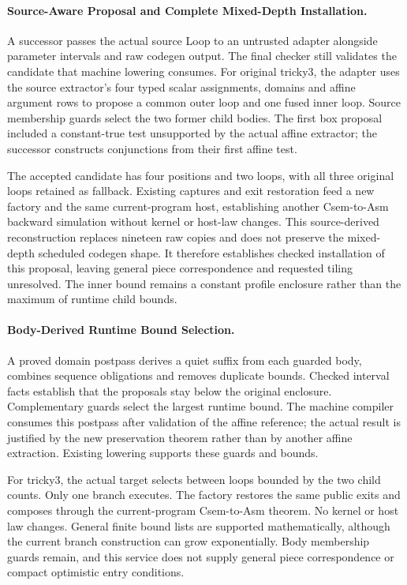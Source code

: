 \paragraph{Source-Aware Proposal and Complete Mixed-Depth Installation.}
A successor passes the actual source Loop to an untrusted adapter alongside
parameter intervals and raw codegen output. The final checker still validates
the candidate that machine lowering consumes. For original tricky3, the adapter
uses the source extractor's four typed scalar assignments, domains and affine
argument rows to propose a common outer loop and one fused inner loop. Source
membership guards select the two former child bodies. The first box proposal
included a constant-true test unsupported by the actual affine extractor;
the successor constructs conjunctions from their first affine test.

The accepted candidate has four positions and two loops, with all three
original loops retained as fallback. Existing captures and exit restoration
feed a new factory and the same current-program host, establishing another
Csem-to-Asm backward simulation without kernel or host-law changes. This
source-derived reconstruction replaces nineteen raw copies and does not
preserve the mixed-depth scheduled codegen shape. It therefore establishes
checked installation of this proposal, leaving general piece correspondence
and requested tiling unresolved. The inner bound remains a constant profile
enclosure rather than the maximum of runtime child bounds.

\paragraph{Body-Derived Runtime Bound Selection.}
A proved domain postpass derives a quiet suffix from each guarded body,
combines sequence obligations and removes duplicate bounds. Checked interval
facts establish that the proposals stay below the original enclosure.
Complementary guards select the largest runtime bound. The machine compiler
consumes this postpass after validation of the affine reference; the actual
result is justified by the new preservation theorem rather than by another
affine extraction. Existing lowering supports these guards and bounds.

For tricky3, the actual target selects between loops bounded by the two child
counts. Only one branch executes. The factory restores the same public exits
and composes through the current-program Csem-to-Asm theorem. No kernel or
host law changes. General finite bound lists are supported mathematically,
although the current branch construction can grow exponentially. Body
membership guards remain, and this service does not supply general piece
correspondence or compact optimistic entry conditions.


